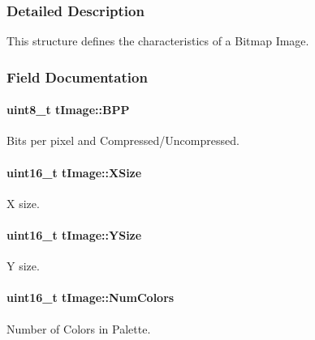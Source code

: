 \subsubsection{Detailed Description}
This structure defines the characteristics of a Bitmap Image. 

\subsubsection{Field Documentation}
\paragraph[{B\+P\+P}]{\setlength{\rightskip}{0pt plus 5cm}uint8\+\_\+t t\+Image\+::\+B\+P\+P}\label{structt_image_a14fdec54a22919a1dd01696d822d7bc1}


Bits per pixel and Compressed/\+Uncompressed. 

\paragraph[{X\+Size}]{\setlength{\rightskip}{0pt plus 5cm}uint16\+\_\+t t\+Image\+::\+X\+Size}\label{structt_image_a75c4236e788d7b87125fe4ac9c2c093f}


X size. 

\paragraph[{Y\+Size}]{\setlength{\rightskip}{0pt plus 5cm}uint16\+\_\+t t\+Image\+::\+Y\+Size}\label{structt_image_aabec4fd2b1674b99883cde5f05f8adff}


Y size. 

\paragraph[{Num\+Colors}]{\setlength{\rightskip}{0pt plus 5cm}uint16\+\_\+t t\+Image\+::\+Num\+Colors}\label{structt_image_a7cfdcf29e774c99da8ed4cd412369033}


Number of Colors in Palette. 

